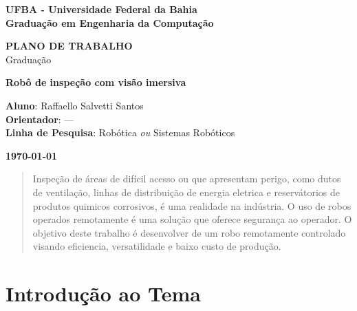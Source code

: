 \documentclass[a4paper,12pt]{article}
\begin{document}

\begin{titlepage}
\thispagestyle{empty}
\begin{center}
\large{\bf{UFBA - Universidade Federal da Bahia}} \\
\large{\bf{Graduação em Engenharia da Computação}} \\
\end{center}
\vfill

\centering
\textbf{{\LARGE PLANO DE TRABALHO}}  \\ \vspace{0.5cm}
{\LARGE Graduação}
\vfill




\textbf{{\Large Robô de inspeção com visão imersiva}} \\ %
\vfill
\begin{flushleft}
\textbf{Aluno}: Raffaello Salvetti Santos \hfill{}\\
\textbf{Orientador}: --- \hfill{}\\
\textbf{Linha de Pesquisa}: Robótica {\it ou} Sistemas Robóticos \hfill{}\\
\end{flushleft}

\vfill


\begin{center}
\large{\bf{\today}}
\end{center}
\end{titlepage}



\begin{abstract}
Inspeção de áreas de difícil acesso ou que apresentam perigo, como dutos de ventilação, linhas de distribuição de energia eletrica e reservátorios de produtos quimicos corrosivos, é uma realidade na indústria. O uso de robos operados remotamente é uma solução que oferece segurança ao operador. O objetivo deste trabalho é desenvolver de um robo remotamente controlado visando eficiencia, versatilidade e baixo custo de produção.
\end{abstract}


\section{Introdução ao Tema}
\end{document}
